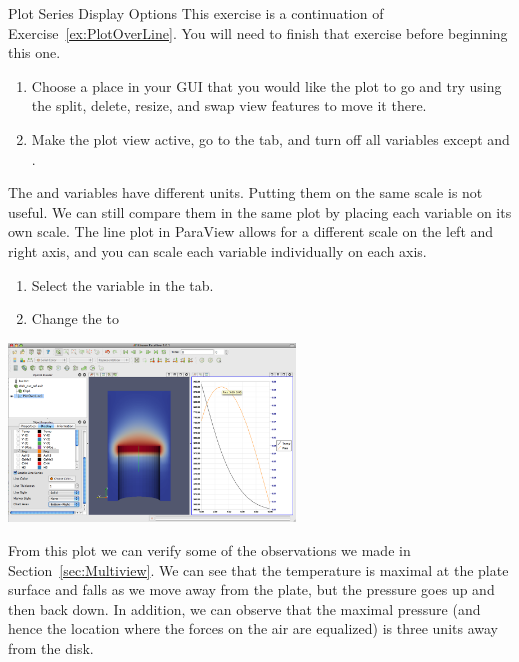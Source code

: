\begin{exercise}{Plot Series Display Options}
  \label{ex:PlotSeriesDisplayOptions}%
  This exercise is a continuation of Exercise~\ref{ex:PlotOverLine}.  You
  will need to finish that exercise before beginning this one.

  \begin{enumerate}
  \item Choose a place in your GUI that you would like the plot to go and
    try using the split, delete, resize, and swap view features to move it
    there.
  \item Make the plot view active, go to the  tab, and turn
    off all variables except  and .
    \savecounter
  \end{enumerate}

  The  and  variables have different units.  Putting
  them on the same scale is not useful.  We can still compare them in the
  same plot by placing each variable on its own scale.  The line plot in
  ParaView allows for a different scale on the left and right axis, and you
  can scale each variable individually on each axis.

  \begin{enumerate}
    \restorecounter
  \item Select the  variable in the  tab.
  \item Change the  to 
  \end{enumerate}

  \begin{inlinefig}
    \includegraphics[width=3in]{images/LinePlot3}
  \end{inlinefig}

  From this plot we can verify some of the observations we made in
  Section~\ref{sec:Multiview}.  We can see that the temperature is maximal
  at the plate surface and falls as we move away from the plate, but the
  pressure goes up and then back down.  In addition, we can observe that
  the maximal pressure (and hence the location where the forces on the air
  are equalized) is three units away from the disk.
\end{exercise}

